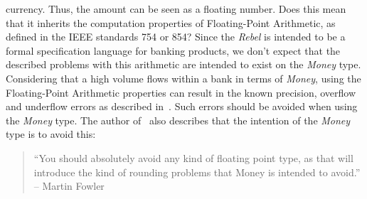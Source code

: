 currency. Thus, the amount can be seen as a floating number. Does this mean that
it inherits the computation properties of Floating-Point Arithmetic, as defined
in the IEEE standards 754 or 854? Since the \textit{Rebel} is intended to be a
formal specification language for banking products, we don't expect that the
described problems with this arithmetic are intended to exist on the
\textit{Money} type. Considering that a high volume flows within a bank in terms
of \textit{Money}, using the Floating-Point Arithmetic properties can result in
the known precision, overflow and underflow errors as described
in~\cite{goldberg1991every}. Such errors should be avoided when using the
\textit{Money} type. The author of~\cite{fowler2002patterns} also describes that
the intention of the \textit{Money} type is to avoid this:
\begin{quote}
	``You should absolutely avoid any kind of floating point type, as that will
	introduce the kind of rounding problems that Money is intended to avoid.''
    -- Martin Fowler~\cite{fowler2002patterns}
\end{quote}

